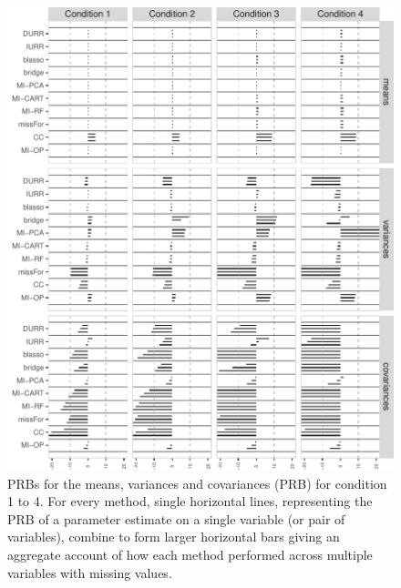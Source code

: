 \begin{figure}
	\includegraphics{../../output/graphs/exp2_semR_bias_58_summy.pdf}
\caption{PRBs for the means, variances and covariances (PRB) for condition 1 to 4.
	For every method, single horizontal lines, representing the PRB of a parameter estimate on 
	a single variable (or pair of variables), combine to form larger horizontal bars giving an 
	aggregate account of how each method performed across multiple variables with missing values.
}
\label{fig:exp2bias58}
\end{figure}

